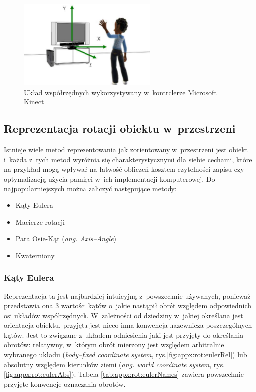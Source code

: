 \begin{figure}
	\centering
	\includegraphics[width=0.6\textwidth]{images/skeletonSpace.png}
	\caption{Układ współrzędnych wykorzystywany w~kontrolerze Microsoft Kinect \cite{msdn:kinectCoordSpace2016}}
	\label{fig:characteristics:kinect:space}
\end{figure}
		

\subsection{Reprezentacja rotacji obiektu w~przestrzeni}\label{chap:orientstionRep}
Istnieje wiele metod reprezentowania jak zorientowany w~przestrzeni jest obiekt i~każda z~tych metod wyróżnia się charakterystycznymi dla siebie cechami, które na przykład mogą wpływać na łatwość obliczeń kosztem czytelności zapisu czy optymalizacją użycia pamięci w~ich implementacji komputerowej. Do najpopularniejszych można zaliczyć następujące metody:
	
\begin{itemize}
	\item Kąty Eulera
	\item Macierze rotacji
	\item Para Osie-Kąt (\emph{ang. Axis--Angle})
	\item Kwaterniony
\end{itemize} 
		
\subsubsection*{Kąty Eulera} \label{sec:orientstionRep:euler}
Reprezentacja ta jest najbardziej intuicyjną z~powszechnie używanych, ponieważ przedstawia ona 3 wartości kątów o~jakie nastąpił obrót względem odpowiednich osi układów współrzędnych. W~zależności od dziedziny w~jakiej określana jest orientacja obiektu, przyjęta jest nieco inna konwencja nazewnicza poszczególnych kątów. Jest to związane z~układem odniesienia jaki jest przyjęty do określania obrotów: relatywny, w~którym obrót mierzony jest względem arbitralnie wybranego układu (\emph{body--fixed coordinate system}, rys.\ref{fig:appx:rot:eulerRel}) lub absolutny względem kierunków ziemi (\emph{ang. world coordinate system}, rys.\ref{fig:appx:rot:eulerAbs}). Tabela \ref{tab:appx:rot:eulerNames} zawiera powszechnie przyjęte konwencje oznaczania obrotów.
		
